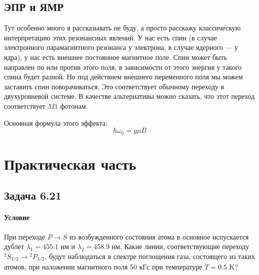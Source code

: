 \documentclass[12pt]{article}
\begin{document}
\subsection{ЭПР и ЯМР}
Тут особенно много я рассказывать не буду, а просто расскажу классическую интерпретацию этих резонансных явлений. У нас есть спин (в случае электронного парамагнитного резонанса у электрона, в случае ядерного --- у ядра), у нас есть внешнее постоянное магнитное поле. Спин может быть направлен по или против этого поля, в зависимости от этого энергия у такого спина будет разной. Но под действием внешнего переменного поля мы можем заставить спин поворачиваться. Это соответствует обычному переходу в двухуровневой системе. В качестве альтернативы можно сказать, что этот переход соответствует $M1$ фотонам.

Основная формула этого эффекта:
\begin{equation*}
    \hbar \omega_0 = g\mu B
\end{equation*}


\section{Практическая часть}
\subsection{Задача 6.21}
\label{task_6.21}
\paragraph{Условие} При переходе $P \rightarrow S$ из возбужденного состояния атома в основное испускается дублет $\lambda_1 = 455.1$ нм и $\lambda_2 = 458.9$ нм. Какие линии, соответствующие переходу ${}^2S_{1/2} \rightarrow {}^2P_{3/2}$, будут наблюдаться в спектре поглощения газа, состоящего из таких атомов, при наложении магнитного поля 50 кГс при температуре $T=0.5$ K?
\end{document}
